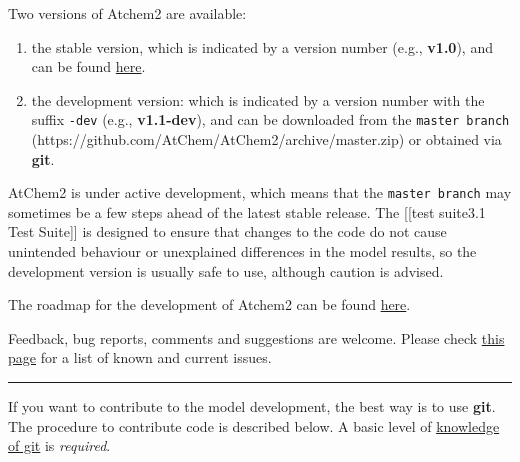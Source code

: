 Two versions of Atchem2 are available:

\begin{enumerate}
\def\labelenumi{\arabic{enumi})}
\item
  the stable version, which is indicated by a version number (e.g.,
  \textbf{v1.0}), and can be found
  \href{https://github.com/AtChem/AtChem2/releases}{here}.
\item
  the development version: which is indicated by a version number with
  the suffix \texttt{-dev} (e.g., \textbf{v1.1-dev}), and can be
  downloaded from the \texttt{master\ branch}
  (https://github.com/AtChem/AtChem2/archive/master.zip) or obtained via
  \textbf{git}.
\end{enumerate}

AtChem2 is under active development, which means that the
\texttt{master\ branch} may sometimes be a few steps ahead of the latest
stable release. The {[}{[}test suite\textbar{}3.1 Test Suite{]}{]} is
designed to ensure that changes to the code do not cause unintended
behaviour or unexplained differences in the model results, so the
development version is usually safe to use, although caution is advised.

The roadmap for the development of Atchem2 can be found
\href{https://github.com/AtChem/AtChem2/projects/1}{here}.

Feedback, bug reports, comments and suggestions are welcome. Please
check \href{https://github.com/AtChem/AtChem2/issues}{this page} for a
list of known and current issues.

\begin{center}\rule{0.5\linewidth}{\linethickness}\end{center}

If you want to contribute to the model development, the best way is to
use \textbf{git}. The procedure to contribute code is described below. A
basic level of
\href{https://swcarpentry.github.io/git-novice/}{knowledge of git} is
\emph{required}.

